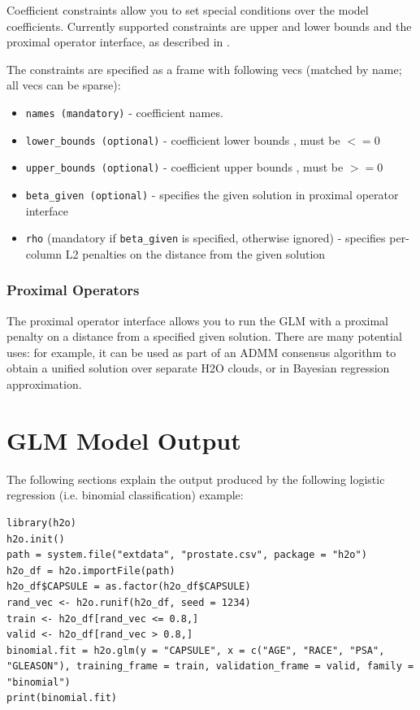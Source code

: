 Coefficient constraints allow you to set special conditions over the model coefficients. Currently supported
constraints are upper and lower bounds and the proximal operator interface, as described in .

The constraints are specified as a frame with following vecs (matched by name; all vecs can be sparse):

\begin{itemize}
\item \texttt{names (mandatory)}  - coefficient names. 
\item \texttt{lower\_bounds (optional)} - coefficient lower bounds , must be $<= 0$
\item \texttt{upper\_bounds (optional)} - coefficient upper bounds , must be $>= 0$
\item \texttt{beta\_given (optional)} - specifies the given solution in proximal operator interface
\item \texttt{rho} (mandatory if \texttt{beta\_given} is specified, otherwise ignored) - specifies per-column L2 penalties on the distance from the given solution
\end{itemize}
 
\subsubsection{Proximal Operators}

The proximal operator interface allows you to run the GLM with a proximal penalty on a distance from a specified
given solution. There are many potential uses: for example, it can be used as part of an ADMM consensus algorithm
to obtain a unified solution over separate H2O clouds, or in Bayesian regression approximation.


\section{GLM Model Output}

The following sections explain the output produced by the following logistic regression (i.e. binomial
classification) example:

\begin{lstlisting}[style=R]
library(h2o)
h2o.init()
path = system.file("extdata", "prostate.csv", package = "h2o")
h2o_df = h2o.importFile(path)
h2o_df$CAPSULE = as.factor(h2o_df$CAPSULE)
rand_vec <- h2o.runif(h2o_df, seed = 1234)
train <- h2o_df[rand_vec <= 0.8,]
valid <- h2o_df[rand_vec > 0.8,]
binomial.fit = h2o.glm(y = "CAPSULE", x = c("AGE", "RACE", "PSA", "GLEASON"), training_frame = train, validation_frame = valid, family = "binomial")
print(binomial.fit)
\end{lstlisting}

